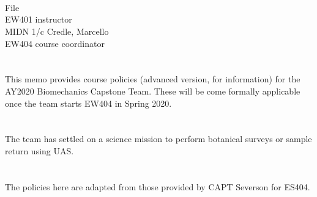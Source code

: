 \documentclass[10pt,courier]{navymemo}
\begin{document}
\noclosing{}\\
\noindent\hspace*{4in}
\signature{D Evangelista}

\noindent\hspace*{4in}{207 Maury Hall}\\
\hspace*{4in}{(410) 293-6132}\\

\copyto{}
File\\
EW401 instructor\\
MIDN 1/c Credle, Marcello\\
EW404 course coordinator


\navyrecordnote
\thispagestyle{empty}



\navyrecordnotesubjline

\section{} This memo provides course policies (advanced version, for information) for the AY2020 Biomechanics Capstone Team. These will be come formally applicable once the team starts EW404 in Spring 2020. 

\section{} The team has settled on a science mission to perform botanical surveys or sample return using UAS. 

\section{}  The policies here are adapted from those provided by CAPT Severson for ES404.  
\end{document}
